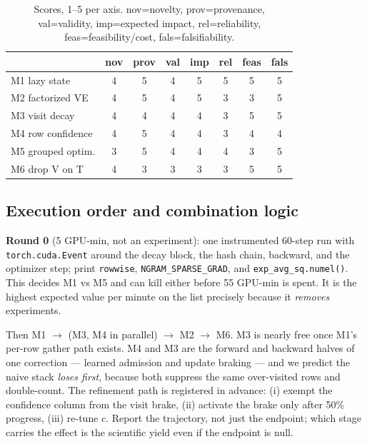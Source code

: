 \documentclass{article}
\begin{document}
\begin{table}[t]
\caption{Scores, 1--5 per axis. nov=novelty, prov=provenance, val=validity, imp=expected impact, rel=reliability, feas=feasibility/cost, fals=falsifiability.}
\label{tab:scores}
\vskip 0.1in
\begin{center}\begin{small}
\begin{tabular}{lccccccc}
\toprule
 & nov & prov & val & imp & rel & feas & fals \\
\midrule
M1 lazy state      & 4 & 5 & 4 & 5 & 5 & 5 & 5 \\
M2 factorized VE   & 4 & 5 & 4 & 5 & 3 & 3 & 5 \\
M3 visit decay     & 4 & 4 & 4 & 4 & 3 & 5 & 5 \\
M4 row confidence  & 4 & 5 & 4 & 4 & 3 & 4 & 4 \\
M5 grouped optim.  & 3 & 5 & 4 & 4 & 4 & 3 & 5 \\
M6 drop V on T     & 4 & 3 & 3 & 3 & 3 & 5 & 5 \\
\bottomrule
\end{tabular}
\end{small}\end{center}
\vskip -0.1in
\end{table}

\subsection{Execution order and combination logic}
\textbf{Round 0} (5 GPU-min, not an experiment): one instrumented 60-step run with \texttt{torch.cuda.Event} around the decay block, the hash chain, backward, and the optimizer step; print \texttt{rowwise}, \texttt{NGRAM\_SPARSE\_GRAD}, and \texttt{exp\_avg\_sq.numel()}. This decides M1 vs M5 and can kill either before 55 GPU-min is spent. It is the highest expected value per minute on the list precisely because it \emph{removes} experiments.

Then M1 $\to$ (M3, M4 in parallel) $\to$ M2 $\to$ M6. M3 is nearly free once M1's per-row gather path exists. M4 and M3 are the forward and backward halves of one correction --- learned admission and update braking --- and we predict the naive stack \emph{loses first}, because both suppress the same over-visited rows and double-count. The refinement path is registered in advance: (i) exempt the confidence column from the visit brake, (ii) activate the brake only after 50\% progress, (iii) re-tune $c$. Report the trajectory, not just the endpoint; which stage carries the effect is the scientific yield even if the endpoint is null.
\end{document}
